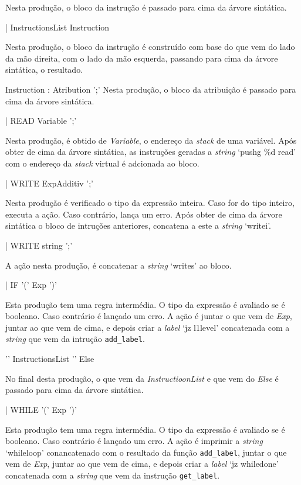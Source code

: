 Nesta produção, o bloco da instrução é passado para cima da árvore sintática.


| InstructionsList Instruction          

Nesta produção, o bloco da instrução é construído com base do que vem do lado da
mão direita, com o lado da mão esquerda, passando para cima da árvore sintática,
o resultado.



Instruction : Atribution ';'           
Nesta produção, o bloco da atribuição é passado para cima da árvore sintática.

| READ  Variable ';'      

Nesta produção, é obtido de \emph{Variable}, o endereço da \emph{stack} de uma
variável. Após obter de cima da árvore sintática, as instruções geradas a 
\emph{string} `pushg \%d read'  com o endereço
da \emph{stack} virtual é adcionada ao bloco.

| WRITE ExpAdditiv ';'    

Nesta produção é verificado o tipo da expressão inteira. Caso for do tipo
inteiro, executa a ação. Caso contrário, lança um erro.
Após obter de cima da árvore sintática o bloco de intruções anteriores,
concatena a este a \emph{string} `writei'. 

| WRITE string ';'        

A ação nesta produção, é concatenar a \emph{string} `writes' ao bloco.


| IF '('  Exp ')' 

Esta produção tem uma regra intermédia. O tipo da expressão é avaliado se é
booleano. Caso contrário é lançado um erro. A ação é juntar o que vem de
\emph{Exp}, juntar ao que vem de cima, e depois criar a \emph{label} `jz
l1level' concatenada com a \emph{string} que vem da intrução \texttt{add\_label}. 

'{' InstructionsList '}' Else          

No final desta produção, o que vem da \emph{InstructioonList}  e que vem do
\emph{Else} é passado para cima da árvore sintática. 

| WHILE '(' Exp ')' 

Esta produção tem uma regra intermédia. O tipo da expressão é avaliado se é
booleano. Caso contrário é lançado um erro. A ação é 
imprimir a \emph{string} `whileloop' conancatenado com o resultado da função
\texttt{add\_label},  juntar o que vem de \emph{Exp}, juntar ao que vem de cima,
e depois criar a \emph{label} `jz whiledone' concatenada com a \emph{string} que
vem da instrução \texttt{get\_label}. 


